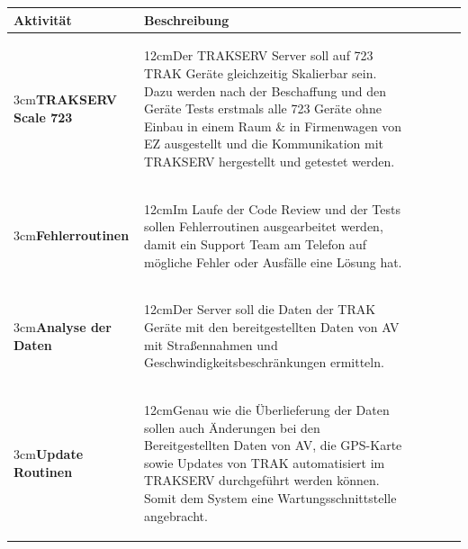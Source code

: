 \documentclass[a4paper,10pt]{scrartcl}
\newcommand\Umbruch[2][3cm]{\begin{varwidth}{#1}\centering#2\end{varwidth}}
\newcommand\Absatz[2][12cm]{\begin{varwidth}{#1}\flushleft#2\end{varwidth}}
\begin{document}
\begin{adjustbox}{width=\textwidth}
\begin{tabular}{llrrrr} 
\toprule
\textbf{Aktivität} & \textbf{Beschreibung}\\
\midrule 
\midrule
{\Umbruch{\textbf{TRAKSERV Scale 723}}}  & {\Absatz{Der TRAKSERV Server soll auf 723 TRAK Geräte gleichzeitig Skalierbar sein. Dazu werden nach der Beschaffung und den Geräte Tests erstmals alle 723 Geräte
ohne Einbau in einem Raum \& in Firmenwagen von EZ ausgestellt und die Kommunikation mit TRAKSERV hergestellt und getestet werden. 
\linebreak}} \\
\midrule
{\Umbruch{\textbf{Fehlerroutinen}}}  & {\Absatz{Im Laufe der Code Review und der Tests sollen Fehlerroutinen ausgearbeitet werden, damit ein Support Team am Telefon auf mögliche Fehler
oder Ausfälle eine Lösung hat.\linebreak}} \\
\midrule
{\Umbruch{\textbf{Analyse der Daten}}}  & {\Absatz{Der Server soll die Daten der TRAK Geräte
mit den bereitgestellten Daten von AV mit Straßennahmen und Geschwindigkeitsbeschränkungen ermitteln.\linebreak}} \\
\midrule
{\Umbruch{\textbf{Update Routinen}}}  & {\Absatz{Genau wie die Überlieferung der Daten sollen auch
Änderungen bei den Bereitgestellten Daten von AV, die GPS-Karte sowie Updates von TRAK automatisiert
im TRAKSERV durchgeführt werden können. Somit dem System eine Wartungsschnittstelle angebracht.\linebreak}} \\


\end{tabular}
\end{adjustbox}
\end{document}
